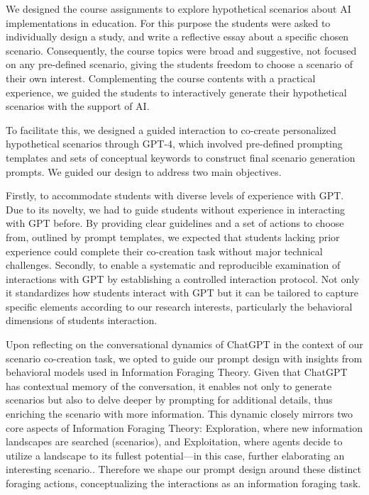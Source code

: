 \documentclass[sn-mathphys, Numbered]{sn-jnl}%
\theoremstyle{thmstyleone}%
\theoremstyle{thmstyletwo}%
\theoremstyle{thmstylethree}%
\begin{document}
We designed the course assignments to explore hypothetical scenarios about AI implementations in education. For this purpose the students were asked to individually design a study, and write a reflective essay about a specific chosen scenario. Consequently, the course topics were broad and suggestive, not focused on any pre-defined scenario, giving the students freedom to choose a scenario of their own interest. 
Complementing the course contents with a practical experience, we guided the students to interactively generate their hypothetical scenarios with the support of AI. 


To facilitate this, we designed a guided interaction to co-create personalized hypothetical scenarios through GPT-4, which involved pre-defined prompting templates and sets of conceptual keywords to construct final scenario generation prompts. We guided our design to address two main objectives.

Firstly, to accommodate students with diverse levels of experience with GPT. Due to its novelty, we had to guide students without experience in interacting with GPT before. By providing clear guidelines and a set of actions to choose from, outlined by prompt templates, we expected that students lacking prior experience could complete their co-creation task without major technical challenges.
Secondly, to enable a systematic and reproducible examination of interactions with GPT by establishing a controlled interaction protocol. Not only it standardizes how students interact with GPT but it can be tailored to capture specific elements according to our research interests, particularly the behavioral dimensions of students interaction.

Upon reflecting on the conversational dynamics of ChatGPT in the context of our scenario co-creation task, we opted to guide our prompt design with insights from behavioral models used in Information Foraging Theory. Given that ChatGPT has contextual memory of the conversation, it enables not only to generate scenarios but also to delve deeper by prompting for additional details, thus enriching the scenario with more information. This dynamic closely mirrors two core aspects of Information Foraging Theory: Exploration, where new information landscapes are searched (scenarios), and Exploitation, where agents decide to utilize a landscape to its fullest potential---in this case, further elaborating an interesting scenario.\parencite{todd_foraging_2020,hills_exploration_2015,cohen_should_2007}. Therefore we shape our prompt design around these distinct foraging actions, conceptualizing the interactions as an information foraging task.
\end{document}
